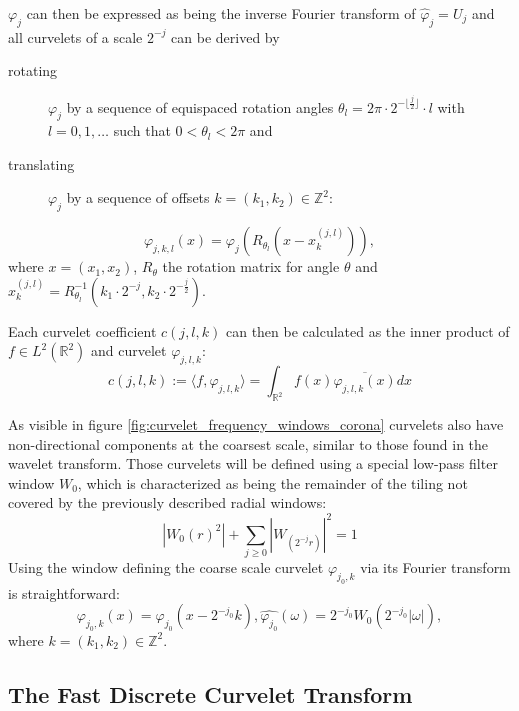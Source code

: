 $\varphi_j$ can then be expressed as being the inverse Fourier transform of
$\hat{\varphi}_j = U_j$ and all curvelets of a scale $2^{-j}$ can be derived by
\begin{description}
    \item[rotating] $\varphi_j$ by a sequence of equispaced rotation angles
        $\theta_l = 2 \pi \cdot 2^{-\lfloor\frac{j}{2}\rfloor} \cdot l$ with $l
        = 0,1,\dots$ such that $0 < \theta_l < 2 \pi$ and
    \item[translating] $\varphi_j$ by a sequence of offsets $k = (k_1, k_2) \in \mathbb{Z}^2$:
\end{description}
\begin{equation} \label{eq:continuous_curvelet}
    \varphi_{j,k,l}(x) = \varphi_j(R_{\theta_l}(x - x_k^{(j,l)})),
\end{equation}
where $x = (x_1, x_2)$, $R_{\theta}$ the rotation matrix for angle $\theta$ and
$x_k^{(j,l)} = R_{\theta_l}^{-1}(k_1 \cdot 2^{-j}, k_2 \cdot
2^{-\frac{j}{2}})$.

Each curvelet coefficient $c(j, l, k)$ can then be calculated as the inner
product of $f \in L^2(\mathbb{R}^2)$ and curvelet $\varphi_{j, l, k}$:
\begin{equation} \label{eq:continuous_curvelet_coefficient}
    c(j, l, k) := \langle f, \varphi_{j, l, k} \rangle = \int_{\mathbb{R}^2} f(x) \overline{\varphi_{j, l, k}(x)} dx
\end{equation}

As visible in figure \ref{fig:curvelet_frequency_windows_corona} curvelets also
have non-directional components at the coarsest scale, similar to those found
in the wavelet transform. Those curvelets will be defined using a special
low-pass filter window $W_0$, which is characterized as being the remainder of
the tiling not covered by the previously described radial windows:
\begin{equation*}
    |W_0(r)^2| + \sum_{j \geq 0} |W_(2^{-j}r)|^2 = 1
\end{equation*}
Using the window defining the coarse scale curvelet $\varphi_{j_0, k}$ via its
Fourier transform is straightforward:
\begin{equation} \label{eq:continuous_coarse_curvelet}
    \varphi_{j_0, k}(x) = \varphi_{j_0}(x-2^{-j_0}k), \hat{\varphi_{j_0}}(\omega) = 2^{-j_0}W_0(2^{-j_0}|\omega|),
\end{equation}
where $k = (k_1, k_2) \in \mathbb{Z}^2$.

\subsection{The Fast Discrete Curvelet Transform}

